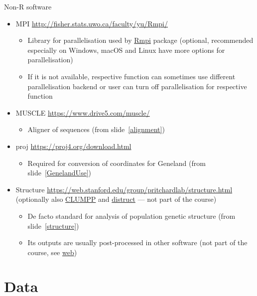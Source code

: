 \documentclass[compress, ucs, xelatex, 11pt, xcolor=svgnames,
	hyperref={
		bookmarks=true,
		unicode=true,
		colorlinks=true,
		pdftitle={Molecular data in R},
		plainpages=false,
		pdfauthor={Vojtech Zeisek},
		pdfsubject={Course about phylogeny and evolution in R},
		pdfcreator={XeLaTeX},
		pdfkeywords={R, evolution, phylogeny, molecular data},
		linkcolor=Tomato,
		anchorcolor=SaddleBrown,
		citecolor=Goldenrod,
		filecolor=DarkMagenta,
		menucolor=Sienna,
		urlcolor=DarkTurquoise,
		pdftex},
	url={hyphens, lowtilde} %
	]{beamer}
\begin{document}
\begin{frame}[allowframebreaks]{Non-R software}
\begin{itemize}
\begin{itemize}
		\end{itemize}
		\item MPI \url{http://fisher.stats.uwo.ca/faculty/yu/Rmpi/}
		\begin{itemize}
			\item Library for parallelisation used by \href{https://CRAN.R-project.org/package=Rmpi}{Rmpi} package (optional, recommended especially on Windows, macOS and Linux have more options for parallelisation)
			\item If it is not available, respective function can sometimes use different parallelisation backend or user can turn off parallelisation for respective function
		\end{itemize}
		\item MUSCLE \url{https://www.drive5.com/muscle/}
		\begin{itemize}
			\item Aligner of sequences (from slide~\ref{alignment})
		\end{itemize}
		\item proj \url{https://proj4.org/download.html}
		\begin{itemize}
			\item Required for conversion of coordinates for Geneland (from slide~\ref{GenelandUse})
		\end{itemize}
		\item Structure \url{https://web.stanford.edu/group/pritchardlab/structure.html} (optionally also \href{https://web.stanford.edu/group/rosenberglab/clumpp.html}{CLUMPP} and \href{https://web.stanford.edu/group/rosenberglab/distruct.html}{distruct} --- not part of the course)
		\begin{itemize}
			\item De facto standard for analysis of population genetic structure (from slide~\ref{structure})
			\item Its outputs are usually post-processed in other software (not part of the course, see \href{https://trapa.cz/en/structure-r-linux}{web})
		\end{itemize}
	\end{itemize}
\end{frame}

\section{Data}
\end{document}
